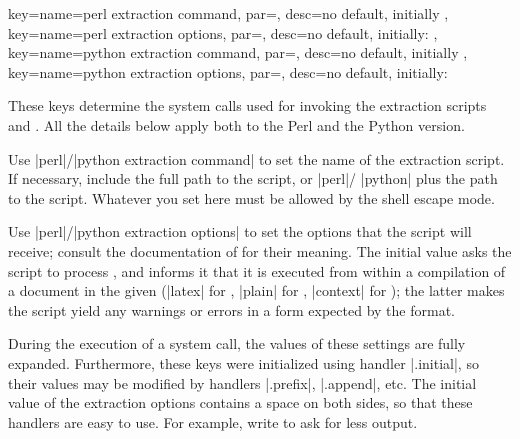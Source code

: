 \documentclass[a4paper,11pt]{article}
\begin{document}
\begin{doc}{
    key={name=perl extraction command, par=,
      desc={no default, initially }},
    key={name=perl extraction options, par=,
      desc={no default, initially: }},
    key={name=python extraction command, par=, desc={no
        default, initially }}, key={name=python
      extraction options, par=, desc={no default, initially:
        }}
  }
  
  These keys determine the system calls used for invoking the extraction
  scripts  and .
  All the details below apply both to the Perl and the Python version.

  Use |perl|\slash|python extraction command| to set the name of the extraction
  script.  If necessary, include the full path to the script, or |perl|\slash
  |python| plus the path to the script.  Whatever you set here must be allowed
  by the shell escape mode.

  Use |perl|\slash|python extraction options| to set the options that the
  script will receive; consult the documentation of
   for their meaning.  The initial value asks the
  script to process \dmmz, and informs it that it is
  executed from within a  compilation of a document in the given
   (|latex| for , |plain| for ,
  |context| for ); the latter makes the script yield any
  warnings or errors in a form expected by the format.

  During the execution of a system call, the values of these settings are fully
  expanded.  Furthermore, these keys were initialized using 
  handler |.initial|, so their values may be modified by handlers |.prefix|,
  |.append|, etc.  The initial value of the extraction options contains a space
  on both sides, so that these handlers are easy to use.  For example, write
   to ask
  for less output.
\end{doc}
\end{document}
